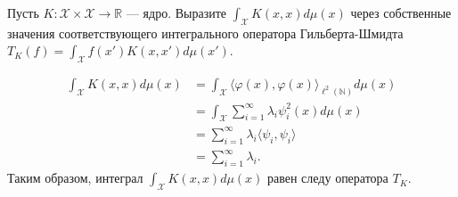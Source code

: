 \begin{problem}
Пусть $K \colon \mathcal{X} \times \mathcal{X} \to \mathbb{R}$ --- ядро. Выразите $\int_\mathcal{X} K(x, x) d\mu(x)$ через собственные значения соответствующего интегрального оператора Гильберта-Шмидта $T_K(f) = \int_\mathcal{X} f(x') K(x, x') d\mu(x')$.
\end{problem}
\begin{solution}
    \begin{align*}
        \int_\mathcal{X} K(x, x) d\mu(x) & = \int_\mathcal{X} \langle \varphi(x), \varphi(x) \rangle_{\ell^2(\mathbb{N})} d\mu(x) \\
                                         & = \int_\mathcal{X} \sum_{i=1}^\infty \lambda_i \psi_i^2(x) d\mu(x)                     \\
                                         & = \sum_{i=1}^\infty \lambda_i \langle \psi_i, \psi_i \rangle                           \\
                                         & = \sum_{i=1}^\infty \lambda_i.
    \end{align*}
    Таким образом, интеграл $\int_\mathcal{X} K(x, x) d\mu(x)$ равен следу оператора $T_K$.
\end{solution}

